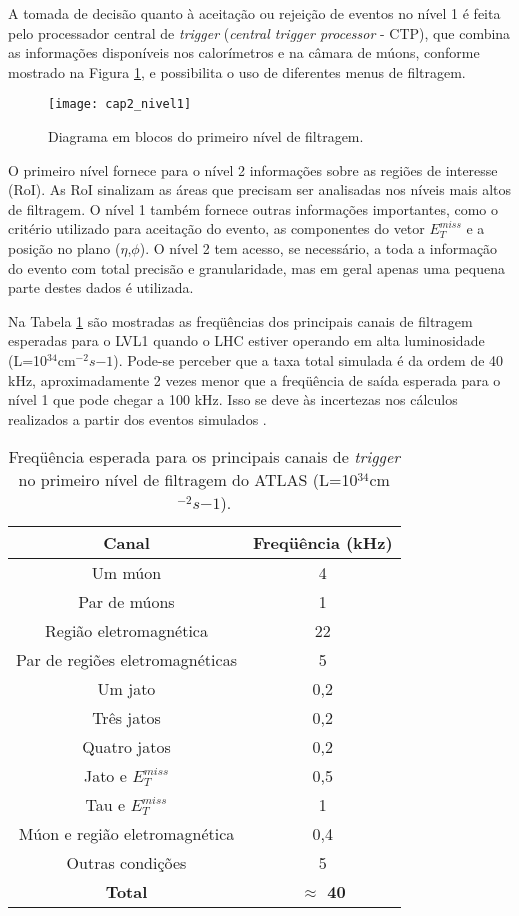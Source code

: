 A tomada de decisão quanto à aceitação ou rejeição de eventos no
nível 1 é feita pelo processador central de \textit{trigger}
(\textit{central trigger processor} - CTP), que combina as
informações disponíveis nos calorímetros e na câmara de múons,
conforme mostrado na Figura \ref{lvl1}, e possibilita o uso de
diferentes menus de filtragem.

\begin{figure} \centering
\texttt{[image: cap2\_nivel1]}
\caption{Diagrama em blocos do primeiro nível de filtragem.}
\label{lvl1}
\end{figure}

O primeiro nível fornece para o nível 2 informações sobre as
regiões de inte\-resse (RoI). As RoI sinalizam as áreas que
precisam ser analisadas nos níveis mais altos de filtragem. O
nível 1 também fornece outras informações importantes, como o
critério utilizado para aceitação do evento, as componentes do
vetor $E_T^{miss}$ e a posição no plano ($\eta$,$\phi$). O nível 2
tem acesso, se necessário, a toda a informação do evento com total
precisão e granularidade, mas em geral apenas uma pequena parte
destes dados é utilizada.

Na Tabela \ref{tab_lvl1} são mostradas as freqüências dos
principais canais de filtragem esperadas para o LVL1 quando o LHC
estiver operando em alta luminosidade (L=10$^{34}$cm$^{-2}s{-1}$).
Pode-se perceber que a taxa total simulada é da ordem de 40 kHz,
aproximadamente 2 vezes menor que a freqüência de saída esperada
para o nível 1 que pode chegar a 100 kHz. Isso se deve às
incertezas nos cálculos realizados a partir dos eventos simulados
\cite{TDR:ATLAS:1998}.

\begin{table}
\centering
\begin{tabular}{c c}
  \hline
  \textbf{Canal} & \textbf{Freqüência (kHz)} \\  \hline
  Um múon  &  4 \\
  Par de múons  & 1 \\
  Região eletromagnética & 22 \\
  Par de regiões eletromagnéticas & 5 \\
  Um jato & 0,2 \\
  Três jatos & 0,2 \\
  Quatro jatos & 0,2 \\
  Jato e $E_T^{miss}$ & 0,5 \\
  Tau e $E_T^{miss}$ & 1 \\
  Múon e região eletromagnética & 0,4 \\
  Outras condições & 5 \\ \hline
  \textbf{Total} & \textbf{$\approx$ 40} \\
  \hline
\end{tabular}
\caption{Freqüência esperada para os principais canais de
\textit{trigger} no primeiro nível de filtragem do ATLAS
(L=10$^{34}$cm$^{-2}s{-1}$).} \label{tab_lvl1}
\end{table}

